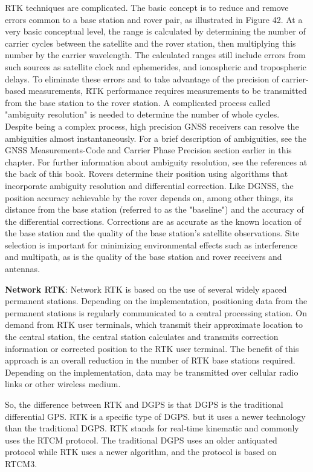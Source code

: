 RTK techniques are complicated. The basic concept is to reduce and remove errors common to a base station and rover pair, as illustrated in Figure 42.
At a very basic conceptual level, the range is calculated by determining the number of carrier cycles between the satellite and the rover station, then multiplying this number by the carrier wavelength.
The calculated ranges still include errors from such sources as satellite clock and ephemerides, and ionospheric and tropospheric delays. To eliminate these errors and to take advantage of the precision of carrier-based measurements, RTK performance requires measurements to be transmitted from the base station to the rover station.
A complicated process called "ambiguity resolution" is needed to determine the number of whole cycles. Despite being a complex process, high precision GNSS receivers can resolve the ambiguities almost instantaneously. For a brief description of ambiguities, see the GNSS Measurements-Code and Carrier Phase Precision section earlier in this chapter. For further information about ambiguity resolution, see the references at the back of this book.
Rovers determine their position using algorithms that incorporate ambiguity resolution and differential correction. Like DGNSS, the position accuracy achievable by the rover depends on, among other things, its distance from the base station (referred to as the "baseline") and the accuracy of the differential corrections.
Corrections are as accurate as the known location of the base station and the quality of the base station's satellite observations. Site selection is important for minimizing environmental effects such as interference and multipath, as is the quality of the base station and rover receivers and antennas.

\textbf{Network RTK}:
Network RTK is based on the use of several widely spaced permanent stations. 
Depending on the implementation, positioning data from the permanent stations is regularly communicated to a central processing station.
On demand from RTK user terminals, which transmit their approximate location to the central station, the central station calculates and transmits correction information or corrected position to the RTK user terminal.
The benefit of this approach is an overall reduction in the number of RTK base stations required. Depending on the implementation, data may be transmitted over cellular radio links or other wireless medium.

So, the difference between RTK and DGPS is that DGPS is the traditional differential GPS.
RTK is a specific type of DGPS.
but it uses a newer technology than the traditional DGPS.
RTK stands for real-time kinematic and commonly uses the RTCM protocol.
The traditional DGPS uses an older antiquated protocol while RTK uses a newer algorithm, and the protocol is based on RTCM3. 

